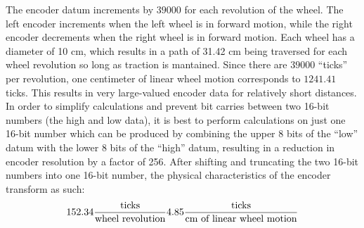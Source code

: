 The encoder datum increments by \(39000\) for each revolution of the
wheel. The left encoder increments when the left wheel is in forward
motion, while the right encoder decrements when the right wheel is in
forward motion. Each wheel has a diameter of 10 cm, which results in a
path of 31.42 cm being traversed for each wheel revolution so long as
traction is mantained. Since there are \(39000\) ``ticks'' per
revolution, one centimeter of linear wheel motion corresponds to
\(1241.41\) ticks. This results in very large-valued encoder data for
relatively short distances. In order to simplify calculations and
prevent bit carries between two 16-bit numbers (the high and low
data), it is best to perform calculations on just one 16-bit number
which can be produced by combining the upper 8 bits of the ``low''
datum with the  lower 8 bits of the ``high'' datum, resulting in a
reduction in encoder resolution by a factor of 256.  After shifting and truncating the two
16-bit numbers into one 16-bit number, the physical characteristics
of the encoder transform as such: 
\[
152.34 \frac{\text{ticks}}{\text{wheel revolution}}\\
4.85 \frac{\text{ticks}}{\text{cm of linear wheel motion}}
\]


